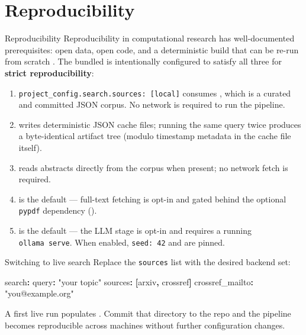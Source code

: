 \documentclass[
  ignorenonframetext,
]{beamer}
\author{\texorpdfstring{}{}}
\date{}
\newenvironment{Shaded}{}{}
\newcommand{\AttributeTok}[1]{\textcolor[rgb]{0.49,0.56,0.16}{#1}}
\newcommand{\FunctionTok}[1]{\textcolor[rgb]{0.02,0.16,0.49}{#1}}
\newcommand{\KeywordTok}[1]{\textcolor[rgb]{0.00,0.44,0.13}{\textbf{#1}}}
\newcommand{\StringTok}[1]{\textcolor[rgb]{0.25,0.44,0.63}{#1}}
\providecommand{\tightlist}{%
  \setlength{\itemsep}{0pt}\setlength{\parskip}{0pt}}
\begin{document}
\section{Reproducibility}\label{sec:reproducibility}

\begin{frame}{Reproducibility}
Reproducibility in computational research has well-documented
prerequisites: open data, open code, and a deterministic build that can
be re-run from scratch . The bundled
 is intentionally configured to satisfy
all three for \textbf{strict reproducibility}:

\begin{enumerate}
\tightlist
\item
  \texttt{project\_config.search.sources:\ {[}local{]}} consumes
  , which is a curated and committed JSON
  corpus. No network is required to run the pipeline.
\item
   writes deterministic
  JSON cache files; running the same query twice produces a
  byte-identical artifact tree (modulo timestamp metadata in the cache
  file itself).
\item
   reads abstracts directly
  from the corpus when present; no network fetch is required.
\item
   is the default ---
  full-text fetching is opt-in and gated behind the optional
  \texttt{pypdf} dependency ().
\item
   is the default --- the LLM stage is
  opt-in and requires a running \texttt{ollama\ serve}. When enabled,
  \texttt{seed:\ 42} and  are pinned.
\end{enumerate}
\end{frame}

\begin{frame}{Switching to live search}
\protect{}\label{switching-to-live-search}
Replace the \texttt{sources} list with the desired backend set:

\begin{Shaded}
\begin{Highlighting}[]
\FunctionTok{search}\KeywordTok{:}
\AttributeTok{  }\FunctionTok{query}\KeywordTok{:}\AttributeTok{ }\StringTok{"your topic"}
\AttributeTok{  }\FunctionTok{sources}\KeywordTok{:}\AttributeTok{ }\KeywordTok{[}\AttributeTok{arxiv}\KeywordTok{,}\AttributeTok{ crossref}\KeywordTok{]}
\AttributeTok{  }\FunctionTok{crossref\_mailto}\KeywordTok{:}\AttributeTok{ }\StringTok{"you@example.org"}
\end{Highlighting}
\end{Shaded}

A first live run populates . Commit that
directory to the repo and the pipeline becomes reproducible across
machines without further configuration changes.
\end{frame}
\end{document}
